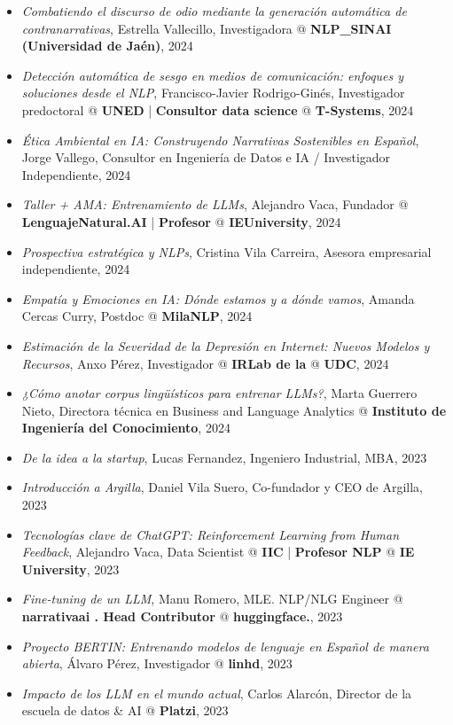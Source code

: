 \begin{itemize}
    \item \textit{Combatiendo el discurso de odio mediante la generación automática de contranarrativas}, Estrella Vallecillo, Investigadora @ \textbf{NLP_SINAI (Universidad de Jaén)}, 2024
    \item \textit{Detección automática de sesgo en medios de comunicación: enfoques y soluciones desde el NLP}, Francisco-Javier Rodrigo-Ginés, Investigador predoctoral @ \textbf{UNED} | \textbf{Consultor data science} @ \textbf{T-Systems}, 2024
    \item \textit{Ética Ambiental en IA: Construyendo Narrativas Sostenibles en Español}, Jorge Vallego, Consultor en Ingeniería de Datos e IA / Investigador Independiente, 2024
    \item \textit{Taller + AMA: Entrenamiento de LLMs}, Alejandro Vaca, Fundador @ \textbf{LenguajeNatural.AI} | \textbf{Profesor} @ \textbf{IEUniversity}, 2024
    \item \textit{Prospectiva estratégica y NLPs}, Cristina Vila Carreira, Asesora empresarial independiente, 2024
    \item \textit{Empatía y Emociones en IA: Dónde estamos y a dónde vamos}, Amanda Cercas Curry, Postdoc @ \textbf{MilaNLP}, 2024
    \item \textit{Estimación de la Severidad de la Depresión en Internet: Nuevos Modelos y Recursos}, Anxo Pérez, Investigador @ \textbf{IRLab de la} @ \textbf{UDC}, 2024
    \item \textit{¿Cómo anotar corpus lingüísticos para entrenar LLMs?}, Marta Guerrero Nieto, Directora técnica en Business and Language Analytics @ \textbf{Instituto de Ingeniería del Conocimiento}, 2024
    \item \textit{De la idea a la startup}, Lucas Fernandez, Ingeniero Industrial, MBA, 2023
    \item \textit{Introducción a Argilla}, Daniel Vila Suero, Co-fundador y CEO de Argilla, 2023
    \item \textit{Tecnologías clave de ChatGPT: Reinforcement Learning from Human Feedback}, Alejandro Vaca, Data Scientist @ \textbf{IIC} | \textbf{Profesor NLP} @ \textbf{IE University}, 2023
    \item \textit{Fine-tuning de un LLM}, Manu Romero, MLE. NLP/NLG Engineer @ \textbf{narrativaai . Head Contributor} @ \textbf{huggingface.}, 2023
    \item \textit{Proyecto BERTIN: Entrenando modelos de lenguaje en Español de manera abierta}, Álvaro Pérez, Investigador @ \textbf{linhd}, 2023
    \item \textit{Impacto de los LLM en el mundo actual}, Carlos Alarcón, Director de la escuela de datos & AI @ \textbf{Platzi}, 2023

\end{itemize}
